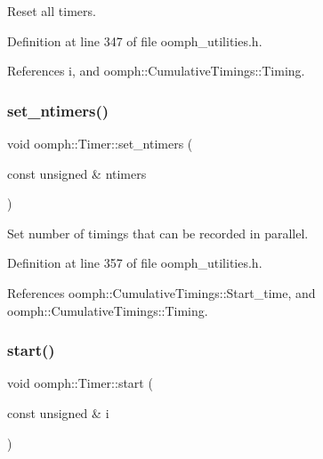 Reset all timers. 



Definition at line 347 of file oomph\+\_\+utilities.\+h.



References i, and oomph\+::\+Cumulative\+Timings\+::\+Timing.

\mbox{\label{classoomph_1_1Timer_a8233e0edd4c33fece829f33aff6c8e5c}} 
\subsubsection{\texorpdfstring{set\+\_\+ntimers()}{set\_ntimers()}}
{\footnotesize\ttfamily void oomph\+::\+Timer\+::set\+\_\+ntimers (\begin{DoxyParamCaption}\item[{const unsigned \&}]{ntimers }\end{DoxyParamCaption})\hspace{0.3cm}{\ttfamily [inline]}}



Set number of timings that can be recorded in parallel. 



Definition at line 357 of file oomph\+\_\+utilities.\+h.



References oomph\+::\+Cumulative\+Timings\+::\+Start\+\_\+time, and oomph\+::\+Cumulative\+Timings\+::\+Timing.

\mbox{\label{classoomph_1_1Timer_aee7db2917caed661ba067c8d10b7e033}} 
\subsubsection{\texorpdfstring{start()}{start()}}
{\footnotesize\ttfamily void oomph\+::\+Timer\+::start (\begin{DoxyParamCaption}\item[{const unsigned \&}]{i }\end{DoxyParamCaption})\hspace{0.3cm}{\ttfamily [inline]}}



